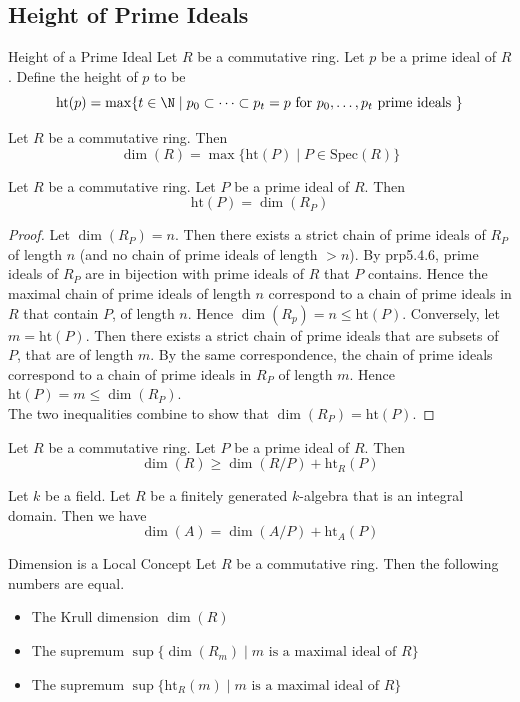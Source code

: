 \documentclass[a4paper]{article}
\begin{document}
\subsection{Height of Prime Ideals}
\begin{defn}{Height of a Prime Ideal}{} Let $R$ be a commutative ring. Let $p$ be a prime ideal of $R$. Define the height of $p$ to be $$\text{ht}(p)=\max\{t\in\N\;|\;p_0\subset\dots\subset p_t=p\text{ for }p_0,\dots,p_t\text{ prime ideals }\}$$
\end{defn}

\begin{lmm}{}{} Let $R$ be a commutative ring. Then $$\dim(R)=\max\{\text{ht}(P)\;|\;P\in\text{Spec}(R)\}$$
\end{lmm}

\begin{lmm}{}{} Let $R$ be a commutative ring. Let $P$ be a prime ideal of $R$. Then $$\text{ht}(P)=\dim(R_P)$$ 
\begin{proof}
Let $\dim(R_P)=n$. Then there exists a strict chain of prime ideals of $R_P$ of length $n$ (and no chain of prime ideals of length $>n$). By prp5.4.6, prime ideals of $R_P$ are in bijection with prime ideals of $R$ that $P$ contains. Hence the maximal chain of prime ideals of length $n$ correspond to a chain of prime ideals in $R$ that contain $P$, of length $n$. Hence $\dim(R_p)=n\leq\text{ht}(P)$. Conversely, let $m=\text{ht}(P)$. Then there exists a strict chain of prime ideals that are subsets of $P$, that are of length $m$. By the same correspondence, the chain of prime ideals correspond to a chain of prime ideals in $R_P$ of length $m$. Hence $\text{ht}(P)=m\leq\dim(R_P)$. \\

The two inequalities combine to show that $\dim(R_P)=\text{ht}(P)$. 
\end{proof}
\end{lmm}

\begin{lmm}{}{} Let $R$ be a commutative ring. Let $P$ be a prime ideal of $R$. Then $$\dim(R)\geq\dim(R/P)+\text{ht}_R(P)$$
\end{lmm}

\begin{prp}{}{} Let $k$ be a field. Let $R$ be a finitely generated $k$-algebra that is an integral domain. Then we have $$\dim(A)=\dim(A/P)+\text{ht}_A(P)$$
\end{prp}

\begin{prp}{Dimension is a Local Concept}{} Let $R$ be a commutative ring. Then the following numbers are equal. 
\begin{itemize}
\item The Krull dimension $\dim(R)$
\item The supremum $\sup\{\dim(R_m)\;|\;m\text{ is a maximal ideal of }R\}$
\item The supremum $\sup\{\text{ht}_R(m)\;|\;m\text{ is a maximal ideal of }R\}$
\end{itemize}
\end{prp}
\end{document}
